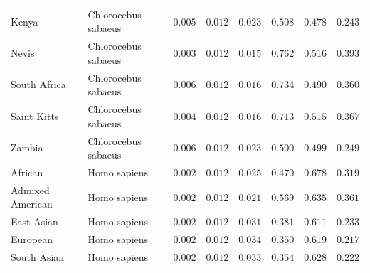 \documentclass[12pt]{article}
\begin{document}
\begin{center}
\begin{longtable*}{|l|l|r|r|r|r|r|r|}
             Kenya & Chlorocebus sabaeus &               $ 0.005$ &              $ 0.012$ &              $ 0.023$ &                                          $ 0.508$ &                         $ 0.478$ &                      $ 0.243$ \\
             Nevis & Chlorocebus sabaeus &               $ 0.003$ &              $ 0.012$ &              $ 0.015$ &                                          $ 0.762$ &                         $ 0.516$ &                      $ 0.393$ \\
             South Africa  & Chlorocebus sabaeus &               $ 0.006$ &              $ 0.012$ &              $ 0.016$ &                                          $ 0.734$ &                         $ 0.490$ &                      $ 0.360$ \\
             Saint Kitts & Chlorocebus sabaeus &               $ 0.004$ &              $ 0.012$ &              $ 0.016$ &                                          $ 0.713$ &                         $ 0.515$ &                      $ 0.367$ \\
             Zambia & Chlorocebus sabaeus &               $ 0.006$ &              $ 0.012$ &              $ 0.023$ &                                          $ 0.500$ &                         $ 0.499$ &                      $ 0.249$ \\
            African &        Homo sapiens &               $ 0.002$ &              $ 0.012$ &              $ 0.025$ &                                          $ 0.470$ &                         $ 0.678$ &                      $ 0.319$ \\
            Admixed American &        Homo sapiens &               $ 0.002$ &              $ 0.012$ &              $ 0.021$ &                                          $ 0.569$ &                         $ 0.635$ &                      $ 0.361$ \\
            East Asian &        Homo sapiens &               $ 0.002$ &              $ 0.012$ &              $ 0.031$ &                                          $ 0.381$ &                         $ 0.611$ &                      $ 0.233$ \\
            European &        Homo sapiens &               $ 0.002$ &              $ 0.012$ &              $ 0.034$ &                                          $ 0.350$ &                         $ 0.619$ &                      $ 0.217$ \\
            South Asian &        Homo sapiens &               $ 0.002$ &              $ 0.012$ &              $ 0.033$ &                                          $ 0.354$ &                         $ 0.628$ &                      $ 0.222$ \\
        \end{longtable*}
    \end{center}
\end{document}
